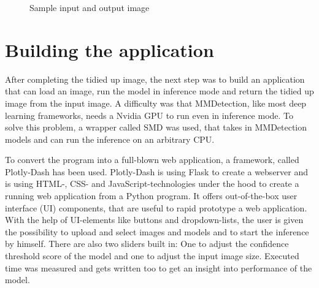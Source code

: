 \begin{figure}[H]
    \centering
    \caption{\label{fig:sample-input-output} Sample input and output image}
\end{figure}

\section{Building the application}

After completing the tidied up image, the next step was to build an application that can load an image, run the model in inference mode and return the tidied up image from the input image. A difficulty was that MMDetection, like most deep learning frameworks, needs a Nvidia GPU to run even in inference mode. To solve this problem, a wrapper called SMD was used, that takes in MMDetection models and can run the inference on an arbitrary CPU. \cite{SMD}

To convert the program into a full-blown web application, a framework, called Plotly-Dash has been used. Plotly-Dash is using Flask to create a webserver and is using HTML-, CSS- and JavaScript-technologies under the hood to create a running web application from a Python program. It offers out-of-the-box user interface (UI) components, that are useful to rapid prototype a web application. With the help of UI-elements like buttons and dropdown-lists, the user is given the possibility to upload and select images and models and to start the inference by himself. There are also two sliders built in: One to adjust the confidence threshold score of the model and one to adjust the input image size. Executed time was measured and gets written too to get an insight into performance of the model.

